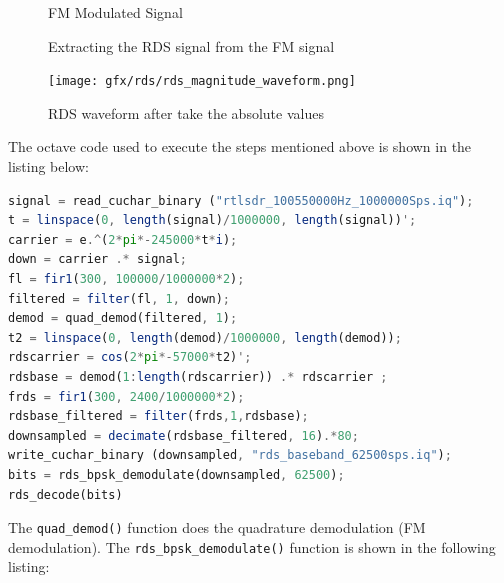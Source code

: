 \begin{figure}

\caption{FM Modulated Signal}
\label{fig:rds_downmixing}
\end{figure}


\begin{figure}


\caption{Extracting the RDS signal from the FM signal}
\label{fig:rds_extraction}
\end{figure}

\begin{figure}
	\centering
	\texttt{[image: gfx/rds/rds\_magnitude\_waveform.png]}
	\caption{RDS waveform after take the absolute values}
	\label{fig:rds_waveform}
\end{figure}

The octave code used to execute the steps mentioned above is shown in the
listing below:

\begin{lstlisting}[label=lst:octave_rds, caption=Octave implementation of the RDS demodulator, language=octave]
signal = read_cuchar_binary ("rtlsdr_100550000Hz_1000000Sps.iq");
t = linspace(0, length(signal)/1000000, length(signal))';
carrier = e.^(2*pi*-245000*t*i);
down = carrier .* signal;
fl = fir1(300, 100000/1000000*2);
filtered = filter(fl, 1, down);
demod = quad_demod(filtered, 1);
t2 = linspace(0, length(demod)/1000000, length(demod));
rdscarrier = cos(2*pi*-57000*t2)';
rdsbase = demod(1:length(rdscarrier)) .* rdscarrier ;
frds = fir1(300, 2400/1000000*2);
rdsbase_filtered = filter(frds,1,rdsbase);
downsampled = decimate(rdsbase_filtered, 16).*80;
write_cuchar_binary (downsampled, "rds_baseband_62500sps.iq");
bits = rds_bpsk_demodulate(downsampled, 62500);
rds_decode(bits)
\end{lstlisting}

The \texttt{quad\_demod()} function does the quadrature demodulation
(FM demodulation). The \texttt{rds\_bpsk\_demodulate()} function is shown
in the following listing:

